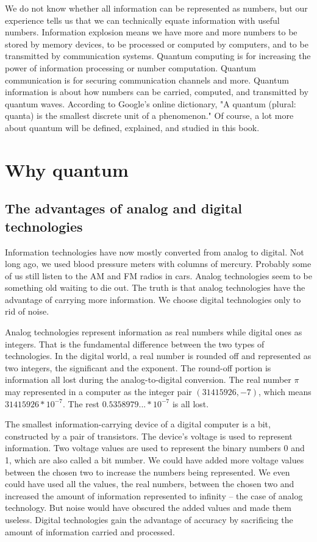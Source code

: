 \documentclass[oneside, letter, 12pt]{book}
\begin{document}
We do not know whether all information can be represented as numbers, but our experience tells us that we can technically equate information with useful numbers. Information explosion means we have more and more numbers to be stored by memory devices, to be processed or computed by computers, and to be transmitted by communication systems. Quantum computing is for increasing the power of information processing or number computation. Quantum communication is for securing communication channels and more. Quantum information is about how numbers can be carried, computed, and transmitted by quantum waves. According to Google's online dictionary, "A quantum (plural: quanta) is the smallest discrete unit of a phenomenon." Of course, a lot more about quantum will be defined, explained, and studied in this book.

\section{Why quantum}
\subsection{The advantages of analog and digital technologies}
Information technologies have now mostly converted from analog to digital. Not long ago, we used blood pressure meters with columns of mercury. Probably some of us still listen to the AM and FM radios in cars. Analog technologies seem to be something old waiting to die out. The truth is that analog technologies have the advantage of carrying more information. We choose digital technologies only to rid of noise.

Analog technologies represent information as real numbers while digital ones as integers. That is the fundamental difference between the two types of technologies. In the digital world, a real number is rounded off and represented as two integers, the significant and the exponent. The round-off portion is information all lost during the analog-to-digital conversion. The real number $\pi$ may represented in a computer as the integer pair $(31415926, -7)$, which means $31415926*10^{-7}$. The rest $0.5358979...*10^{-7}$ is all lost.

The smallest information-carrying device of a digital computer is a bit, constructed by a pair of transistors. The device's voltage is used to represent information. Two voltage values are used to represent the binary numbers 0 and 1, which are also called a bit number. We could have added more voltage values between the chosen two to increase the numbers being represented. We even could have used all the values, the real numbers, between the chosen two and increased the amount of information represented to infinity -- the case of analog technology. But noise would have obscured the added values and made them useless. Digital technologies gain the advantage of accuracy by sacrificing the amount of information carried and processed. 
\end{document}
